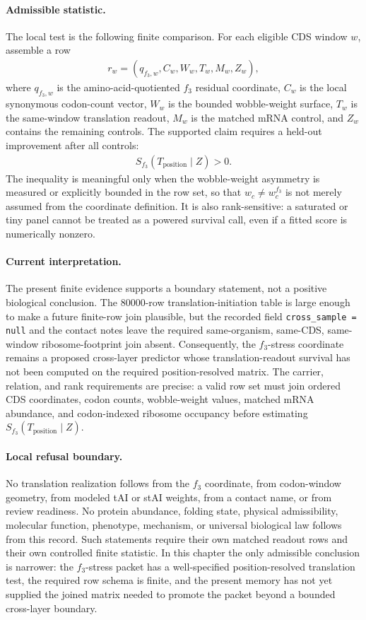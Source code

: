 \paragraph{Admissible statistic.}
The local test is the following finite comparison.  For each eligible CDS window $w$, assemble a row
$$
\begin{aligned}
  r_w=(q_{f_3,w}, C_w, W_w, T_w, M_w, Z_w),
\end{aligned}
$$
where $q_{f_3,w}$ is the amino-acid-quotiented $f_3$ residual coordinate, $C_w$ is the local synonymous codon-count vector, $W_w$ is the bounded wobble-weight surface, $T_w$ is the same-window translation readout, $M_w$ is the matched mRNA control, and $Z_w$ contains the remaining controls.  The supported claim requires a held-out improvement after all controls:
$$
\begin{aligned}
  S_{f_3}(T_{\mathrm{position}}\mid Z)>0.
\end{aligned}
$$
The inequality is meaningful only when the wobble-weight asymmetry is measured or explicitly bounded in the row set, so that $w_c\neq w_c^{f_3}$ is not merely assumed from the coordinate definition.  It is also rank-sensitive: a saturated or tiny panel cannot be treated as a powered survival call, even if a fitted score is numerically nonzero.

\paragraph{Current interpretation.}
The present finite evidence supports a boundary statement, not a positive biological conclusion.  The $80000$-row translation-initiation table is large enough to make a future finite-row join plausible, but the recorded field \texttt{cross\_sample = null} and the contact notes leave the required same-organism, same-CDS, same-window ribosome-footprint join absent.  Consequently, the $f_3$-stress coordinate remains a proposed cross-layer predictor whose translation-readout survival has not been computed on the required position-resolved matrix.  The carrier, relation, and rank requirements are precise: a valid row set must join ordered CDS coordinates, codon counts, wobble-weight values, matched mRNA abundance, and codon-indexed ribosome occupancy before estimating $S_{f_3}(T_{\mathrm{position}}\mid Z)$.

\paragraph{Local refusal boundary.}
No translation realization follows from the $f_3$ coordinate, from codon-window geometry, from modeled tAI or stAI weights, from a contact name, or from review readiness.  No protein abundance, folding state, physical admissibility, molecular function, phenotype, mechanism, or universal biological law follows from this record.  Such statements require their own matched readout rows and their own controlled finite statistic.  In this chapter the only admissible conclusion is narrower: the $f_3$-stress packet has a well-specified position-resolved translation test, the required row schema is finite, and the present memory has not yet supplied the joined matrix needed to promote the packet beyond a bounded cross-layer boundary.